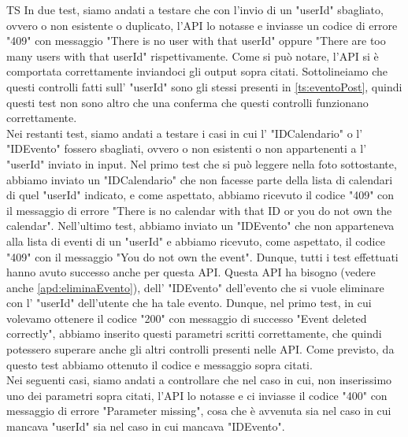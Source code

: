 \begin{listaPersonale}{TS}
                In due test, siamo andati a testare che con l'invio di un "userId" sbagliato, ovvero o non esistente o duplicato, l'API lo notasse e inviasse un codice di errore "409" con messaggio "There is no user with that userId" oppure "There are too many users with that userId" rispettivamente. Come si può notare, l'API si è comportata correttamente inviandoci gli output sopra citati. Sottolineiamo che questi controlli fatti sull' "userId" sono gli stessi presenti in \ref{ts:eventoPost}, quindi questi test non sono altro che una conferma che questi controlli funzionano correttamente.  \\
                Nei restanti test, siamo andati a testare i casi in cui l' "IDCalendario" o l' "IDEvento" fossero sbagliati, ovvero o non esistenti o non appartenenti a l' "userId" inviato in input. Nel primo test che si può leggere nella foto sottostante, abbiamo inviato un "IDCalendario" che non facesse parte della lista di calendari di quel "userId" indicato, e come aspettato, abbiamo ricevuto il codice "409" con il messaggio di errore "There is no calendar with that ID or you do not own the calendar". Nell'ultimo test, abbiamo inviato un "IDEvento" che non apparteneva alla lista di eventi di un "userId" e abbiamo ricevuto, come aspettato, il codice "409" con il messaggio "You do not own the event".  Dunque, tutti i test effettuati hanno avuto successo anche per questa API. 
                Questa API ha bisogno (vedere anche \ref{apd:eliminaEvento}), dell' "IDEvento" dell'evento  che si vuole eliminare con l' "userId" dell'utente che ha tale evento. Dunque, nel primo test, in cui volevamo ottenere il codice "200" con messaggio di successo "Event deleted correctly", abbiamo inserito questi parametri scritti correttamente, che quindi potessero superare anche gli altri controlli presenti nelle API. Come previsto, da questo test abbiamo ottenuto il codice e messaggio sopra citati.
                \\
                Nei seguenti casi, siamo andati a controllare che nel caso in cui, non inserissimo uno dei parametri sopra citati, l'API lo notasse e ci inviasse il codice "400" con messaggio di errore "Parameter missing", cosa che è avvenuta sia nel caso in cui mancava "userId" sia nel caso in cui mancava "IDEvento".
                 \\

\end{listaPersonale}
